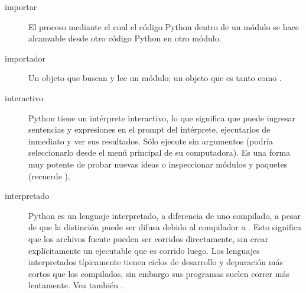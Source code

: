 \documentclass[a4,10pt,spanish]{sphinxmanual}
\begin{document}
\begin{description}
\item[{importar\label{\detokenize{glossary:term-importing}}}] \leavevmode
\sphinxAtStartPar
El proceso mediante el cual el código Python dentro de un módulo se hace alcanzable desde otro código Python en otro módulo.

\item[{importador\label{\detokenize{glossary:term-importer}}}] \leavevmode
\sphinxAtStartPar
Un objeto que buscan y lee un módulo; un objeto que es tanto {\hyperref[\detokenize{glossary:term-finder}]{}} como {\hyperref[\detokenize{glossary:term-loader}]{}}.

\item[{interactivo\label{\detokenize{glossary:term-interactive}}}] \leavevmode
\sphinxAtStartPar
Python tiene un intérprete interactivo, lo que significa que puede ingresar sentencias y expresiones en el prompt del intérprete, ejecutarlos de inmediato y ver sus resultados.  Sólo ejecute  sin argumentos (podría seleccionarlo desde el menú principal de su computadora). Es una forma muy potente de probar nuevas ideas o inspeccionar módulos y paquetes (recuerde  ).

\item[{interpretado\label{\detokenize{glossary:term-interpreted}}}] \leavevmode
\sphinxAtStartPar
Python es un lenguaje interpretado, a diferencia de uno compilado, a pesar de que la distinción puede ser difusa debido al compilador a .  Esto significa que los archivos fuente pueden ser corridos directamente, sin crear explícitamente un ejecutable que es corrido luego. Los lenguajes interpretados típicamente tienen ciclos de desarrollo y depuración más cortos que los compilados, sin embargo sus programas suelen correr más lentamente.  Vea también  {\hyperref[\detokenize{glossary:term-interactive}]{}}.


\end{description}
\end{document}
